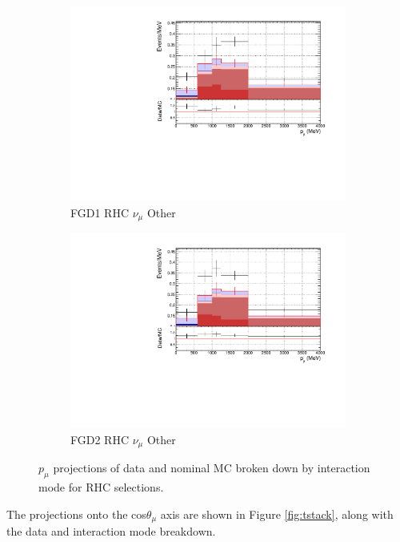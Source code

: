 \begin{figure}[!h]
\begin{subfigure}{0.49\textwidth}
  \centering
  \includegraphics[width=\textwidth]{figs/FGD1_NuMuBkg_CCOther_in_AntiNu_Mode_p}
  \caption{FGD1 RHC $\nu_{\mu}$ Other}
\end{subfigure}
\begin{subfigure}{0.49\textwidth}
  \centering
  \includegraphics[width=\textwidth]{figs/FGD2_NuMuBkg_CCOther_in_AntiNu_Mode_p}
  \caption{FGD2 RHC $\nu_{\mu}$ Other}
\end{subfigure}
\caption{$p_{\mu}$ projections of data and nominal MC broken down by interaction mode for RHC \numu selections.}
\label{fig:pstack_rhc_numu}
\end{figure}


The projections onto the cos$\theta_{\mu}$ axis are shown in Figure \ref{fig:tstack}, along with the data and interaction mode breakdown.

